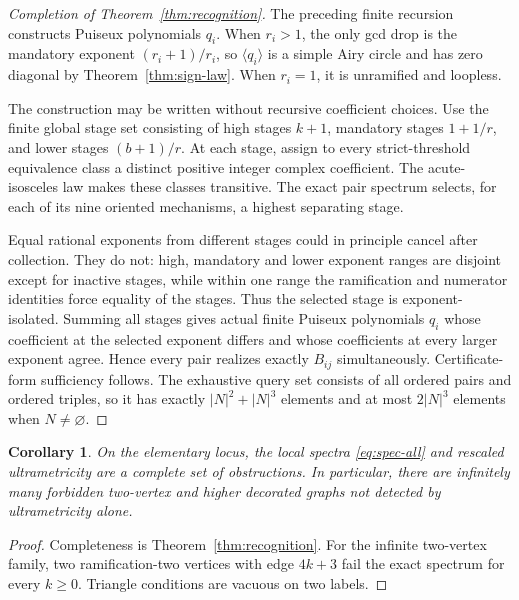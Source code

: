 \documentclass[11pt,a4paper]{amsart}
\theoremstyle{plain}
\newtheorem{corollary}[theorem]{Corollary}
\theoremstyle{definition}
\begin{document}
\begin{proof}[Completion of Theorem~\ref{thm:recognition}]
The preceding finite recursion constructs Puiseux polynomials $q_i$.  When $r_i>1$, the only gcd
drop is the mandatory exponent $(r_i+1)/r_i$, so $\langle q_i\rangle$ is a simple Airy circle and
has zero diagonal by Theorem~\ref{thm:sign-law}.  When $r_i=1$, it is unramified and loopless.

The construction may be written without recursive coefficient choices.  Use the finite global
stage set consisting of high stages $k+1$, mandatory stages $1+1/r$, and lower stages
$(b+1)/r$.  At each stage, assign to every strict-threshold equivalence class a distinct positive
integer complex coefficient.  The acute-isosceles law makes these classes transitive.  The exact
pair spectrum selects, for each of its nine oriented mechanisms, a highest separating stage.

Equal rational exponents from different stages could in principle cancel after collection.  They
do not: high, mandatory and lower exponent ranges are disjoint except for inactive stages, while
within one range the ramification and numerator identities force equality of the stages.  Thus the
selected stage is exponent-isolated.  Summing all stages gives actual finite Puiseux polynomials
$q_i$ whose coefficient at the selected exponent differs and whose coefficients at every larger
exponent agree.  Hence every pair realizes exactly $B_{ij}$ simultaneously.  Certificate-form
sufficiency follows.  The exhaustive query set consists of all ordered pairs and ordered triples,
so it has exactly $|N|^2+|N|^3$ elements and at most $2|N|^3$ elements when $N\ne\varnothing$.
\end{proof}

\begin{corollary}\label{cor:no-further-obstruction}
On the elementary locus, the local spectra \eqref{eq:spec-all} and rescaled ultrametricity are a
complete set of obstructions.  In particular, there are infinitely many forbidden two-vertex and
higher decorated graphs not detected by ultrametricity alone.
\end{corollary}

\begin{proof}
Completeness is Theorem~\ref{thm:recognition}.  For the infinite two-vertex family, two
ramification-two vertices with edge $4k+3$ fail the exact spectrum for every $k\ge0$.  Triangle
conditions are vacuous on two labels.
\end{proof}
\end{document}
